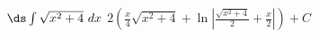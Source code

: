 {$\ds \int \sqrt{x^2+4}\ dx$
}
{$2\left(\frac x4\sqrt{x^2+4}+\ln \left|\frac{\sqrt{x^2+4}}2+\frac x2\right|\right) + C$
}